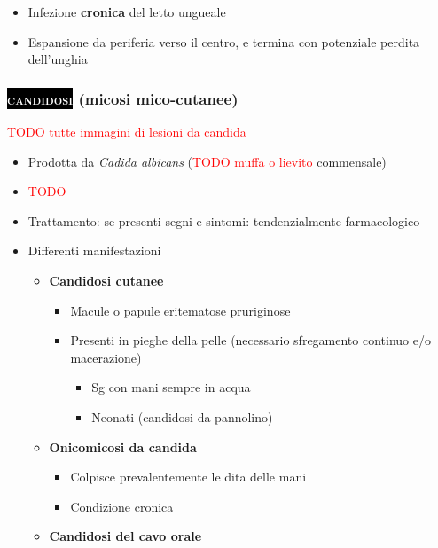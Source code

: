 \documentclass[italian,]{article}
\providecommand{\tightlist}{%
  \setlength{\itemsep}{0pt}\setlength{\parskip}{0pt}}
\newcommand{\pat}[1]{\colorbox{black}{\textcolor{white}{\textsc{#1}}}}
\newcommand{\TODO}[1]{\textcolor{red}{\textsf{\footnotesize{TODO #1}}}} %
\begin{document}
\begin{itemize}
\tightlist
\item
  Infezione \textbf{cronica} del letto ungueale
\item
  Espansione da periferia verso il centro, e termina con potenziale
  perdita dell'unghia
\end{itemize}

\hypertarget{micosi-mico-cutanee}{%
\subsubsection{\texorpdfstring{\pat{candidosi} (micosi
mico-cutanee)}{ (micosi mico-cutanee)}}\label{micosi-mico-cutanee}}

\TODO{tutte immagini di lesioni da candida}

\begin{itemize}
\item
  Prodotta da \emph{Cadida albicans} (\TODO{muffa o lievito} commensale)
\item
  \TODO{}
\item
  Trattamento: se presenti segni e sintomi: tendenzialmente
  farmacologico
\item
  Differenti manifestazioni

  \begin{itemize}
  \tightlist
  \item
    \textbf{Candidosi cutanee}

    \begin{itemize}
    \tightlist
    \item
      Macule o papule eritematose pruriginose
    \item
      Presenti in pieghe della pelle (necessario sfregamento continuo
      e/o macerazione)

      \begin{itemize}
      \tightlist
      \item
        Sg con mani sempre in acqua
      \item
        Neonati (candidosi da pannolino)
      \end{itemize}
    \end{itemize}
  \item
    \textbf{Onicomicosi da candida}

    \begin{itemize}
    \tightlist
    \item
      Colpisce prevalentemente le dita delle mani
    \item
      Condizione cronica
    \end{itemize}
  \item
    \textbf{Candidosi del cavo orale}


\end{itemize}
\end{itemize}
\end{document}
